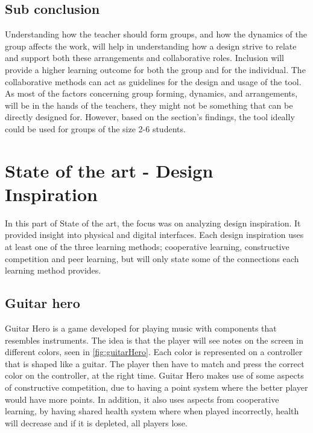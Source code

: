 \subsection{Sub conclusion} %
Understanding how the teacher should form groups, and how the dynamics of the group affects the work, will help in understanding how a design strive to relate and support both these arrangements and collaborative roles. Inclusion will provide a higher learning outcome for both the group and for the individual. The collaborative methods can act as guidelines for the design and usage of the tool.\\

As most of the factors concerning group forming, dynamics, and arrangements,  will be in the hands of the teachers, they might not be something that can be directly designed for.  
However, based on the section's findings, the tool ideally could be used for groups of the size 2-6 students.
 
\section{State of the art - Design Inspiration}\label{sec:sota}
In this part of State of the art, the focus was on analyzing design inspiration. It provided insight into physical and digital interfaces. Each design inspiration uses at least one of the three learning methods; cooperative learning, constructive competition and peer learning, but will only state some of the connections each learning method provides.

\subsection{Guitar hero}\label{sec:guitarHero} 
Guitar Hero is a game developed for playing music with components that resembles instruments. The idea is that the player will see notes on the screen in different colors, seen in \autoref{fig:guitarHero}. Each color is represented on a controller that is shaped like a guitar.  The player then have to match and press the correct color on the controller, at the right time. Guitar Hero makes use of some aspects of constructive competition, due to having a point system where the better player would have more points. In addition, it also uses aspects from cooperative learning, by having shared health system where when played incorrectly, health will decrease and if it is depleted, all players lose.
 

